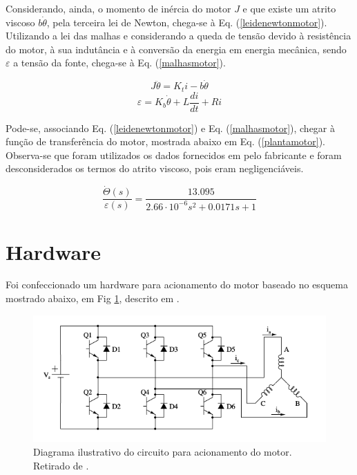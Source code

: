 \documentclass[10pt,fleqn,a4paper]{article}
\begin{document}
    Considerando, ainda, o momento de inércia do motor $J$ e que existe um atrito viscoso $b\dot{\theta}$, pela terceira lei de Newton, chega-se à Eq. (\ref{leidenewtonmotor}). Utilizando a lei das malhas e considerando a queda de tensão devido à resistência do motor, à sua indutância e à conversão da energia em energia mecânica, sendo $\varepsilon$ a tensão da fonte, chega-se à Eq. (\ref{malhasmotor}).
    
    \begin{equation}
    J\ddot{\theta} = K_ti - b\dot{\theta} \label{leidenewtonmotor}
    \end{equation}
    \begin{equation}
    \varepsilon = K_b\dot{\theta} + L\frac{di}{dt} + Ri \label{malhasmotor}
    \end{equation}
    
    Pode-se, associando Eq. (\ref{leidenewtonmotor}) e Eq. (\ref{malhasmotor}), chegar à função de transferência do motor, mostrada abaixo em Eq. (\ref{plantamotor}). Observa-se que foram utilizados os dados fornecidos em \cite{Datasheet} pelo fabricante e foram desconsiderados os termos do atrito viscoso, pois eram negligenciáveis.
    
    \begin{equation}
    \frac{\dot{\Theta}(s)}{\varepsilon(s)} = \frac{13.095}{2.66 \cdot 10^{-6} s^2+0.0171s+1} \label{plantamotor}
    \end{equation}
    
    \section{Hardware}
    
    Foi confeccionado um hardware para acionamento do motor baseado no esquema mostrado abaixo, em Fig \ref{fig:diagrama}, descrito em \cite{atmeldiagrama}. 
    
	\begin{figure}[ht]
		\begin{center}
			\includegraphics[angle=0, scale=0.6]{images/transistores}
		\end{center}
		\caption{Diagrama ilustrativo do circuito para acionamento do motor. Retirado de \cite{modelomotor}.}
		\label{fig:diagrama}
	\end{figure}
    
\end{document}
